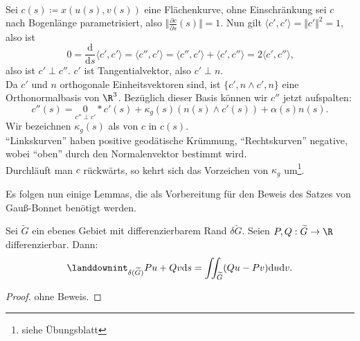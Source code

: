 \begin{definition}
  \ \\
  Sei $ c(s) \coloneqq x(u(s), v(s)) $ eine Flächenkurve, ohne Einschränkung sei $ c $ nach Bogenlänge parametrisiert, also $ \Vert \frac{\partial c}{\partial s} (s) \Vert = 1 $. Nun gilt $ \langle c', c' \rangle = \Vert c' \Vert^2 = 1 $, also ist
  \begin{equation*}
    0 = \frac{\text{d}}{\text{d}s}\langle c', c' \rangle = \langle c'', c' \rangle = \langle c'', c' \rangle + \langle c', c'' \rangle = 2\langle c', c'' \rangle\text{,}
  \end{equation*}
  also ist $ c' \perp c'' $. $ c' $ ist Tangentialvektor, also $ c' \perp n $. \\
  Da $ c' $ und $ n $ orthogonale Einheitsvektoren sind, ist $ \{ c', n \wedge c', n \} $ eine Orthonormalbasis von $ \R^3 $. Bezüglich dieser Basis können wir $ c'' $ jetzt aufspalten:
  \begin{equation*}
    c''(s) = \underset{c'' \perp c'}{0}*c'(s) + \kappa_g(s)(n(s) \wedge c'(s)) + \alpha(s)n(s)\text{.}
  \end{equation*}
  Wir bezeichnen $ \kappa_g(s) $ als \label{def:geodaetischeKruemmung} von $ c $ in $ c(s) $. \\
  ``Linkskurven'' haben positive geodätische Krümmung, ``Rechtskurven'' negative, wobei ``oben'' durch den Normalenvektor bestimmt wird. \\
  Durchläuft man $ c $ rückwärts, so kehrt sich das Vorzeichen von $ \kappa_g $ um\footnote{siehe Übungsblatt}.
\end{definition}

Es folgen nun einige Lemmas, die als Vorbereitung für den Beweis des Satzes von Gauß-Bonnet benötigt werden.

\begin{lemma}
  Sei $ \widetilde{G} $ ein ebenes Gebiet mit differenzierbarem Rand $ \delta\widetilde{G} $. Seien $ P,Q : \widetilde{G} \to \R $ differenzierbar. Dann:
  \begin{equation*}
     \landdownint_{\delta(\widetilde{G})}Pu+Qv \text{d}s = \iint_{\widetilde{G}}(Qu-Pv)\text{d}u\text{d}v\text{.}
  \end{equation*} 
  \begin{proof}
    ohne Beweis.
  \end{proof}
\end{lemma}


